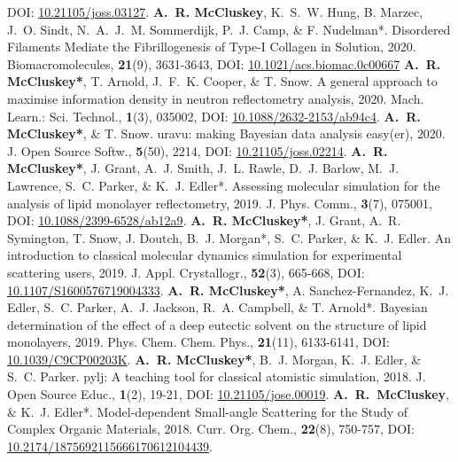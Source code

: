 \begin{benumerate}{23}
    {DOI: \href{https://doi.org/10.21105/joss.03127}{10.21105/joss.03127}.}
  \cvpuby
    {\textbf{A.~R. McCluskey}, K.~S.~W. Hung, B. Marzec, J.~O. Sindt, N.~A.~J.~M. Sommerdijk, P.~J. Camp, \& F. Nudelman*.}
    {Disordered Filaments Mediate the Fibrillogenesis of Type-I Collagen in Solution,}
    {2020.}
    {Biomacromolecules,}
    {\textbf{21}(9), 3631-3643,}
    {DOI: \href{https://doi.org/10.1021/acs.biomac.0c00667}{10.1021/acs.biomac.0c00667}}
  \cvpuby
    {\textbf{A.~R. McCluskey*}, T. Arnold, J.~F.~K. Cooper, \& T. Snow.}
    {A general approach to maximise information density in neutron reflectometry analysis,}
    {2020.}
    {Mach. Learn.: Sci. Technol.,}
    {\textbf{1}(3), 035002,}
    {DOI: \href{https://doi.org/10.1088/2632-2153/ab94c4}{10.1088/2632-2153/ab94c4}.}
  \cvpuby
    {\textbf{A.~R. McCluskey*}, \& T. Snow.}
    {uravu: making Bayesian data analysis easy(er),}
    {2020.}
    {J. Open Source Softw.,}
    {\textbf{5}(50), 2214,}
    {DOI: \href{https://doi.org/10.21105/joss.02214}{10.21105/joss.02214}.}
  \cvpuby
    {\textbf{A.~R. McCluskey*}, J. Grant, A.~J. Smith, J.~L. Rawle, D.~J. Barlow, M.~J. Lawrence, S.~C. Parker, \& K.~J. Edler*.}
    {Assessing molecular simulation for the analysis of lipid monolayer reflectometry,}
    {2019.}
    {J. Phys. Comm.,}
    {\textbf{3}(7), 075001,}
    {DOI: \href{https://doi.org/10.1088/2399-6528/ab12a9}{10.1088/2399-6528/ab12a9}.}
  \cvpuby
    {\textbf{A.~R. McCluskey*}, J. Grant, A.~R. Symington, T. Snow, J. Doutch, B.~J. Morgan*, S.~C. Parker, \& K.~J. Edler.}
    {An introduction to classical molecular dynamics simulation for experimental scattering users,}
    {2019.}
    {J. Appl. Crystallogr.,}
    {\textbf{52}(3), 665-668,}
    {DOI: \href{https://doi.org/10.1107/S1600576719004333}{10.1107/S1600576719004333}.}
  \cvpuby
    {\textbf{A.~R. McCluskey*}, A. Sanchez-Fernandez, K.~J. Edler, S.~C. Parker, A.~J. Jackson, R.~A. Campbell, \& T. Arnold*.}
    {Bayesian determination of the effect of a deep eutectic solvent on the structure of lipid monolayers,}
    {2019.}
    {Phys. Chem. Chem. Phys.,}
    {\textbf{21}(11), 6133-6141,}
    {DOI: \href{https://doi.org/10.1039/C9CP00203K}{10.1039/C9CP00203K}.}
  \cvpuby
    {\textbf{A.~R. McCluskey*}, B.~J. Morgan, K.~J. Edler, \& S.~C. Parker.}
    {pylj: A teaching tool for classical atomistic simulation,}
    {2018.}
    {J. Open Source Educ.,}
    {\textbf{1}(2), 19-21,}
    {DOI: \href{http://doi.org/10.21105/jose.00019}{10.21105/jose.00019}.}
  \cvpuby
    {\textbf{A.~R.~McCluskey}, \& K.~J. Edler*.}
    {Model-dependent Small-angle Scattering for the Study of Complex Organic Materials,}
    {2018.}
    {Curr. Org. Chem.,}
    {\textbf{22}(8), 750-757,}
    {DOI: \href{http://doi.org/10.2174/1875692115666170612104439}{10.2174/1875692115666170612104439}.}
\end{benumerate}
\vspace{-20pt}
